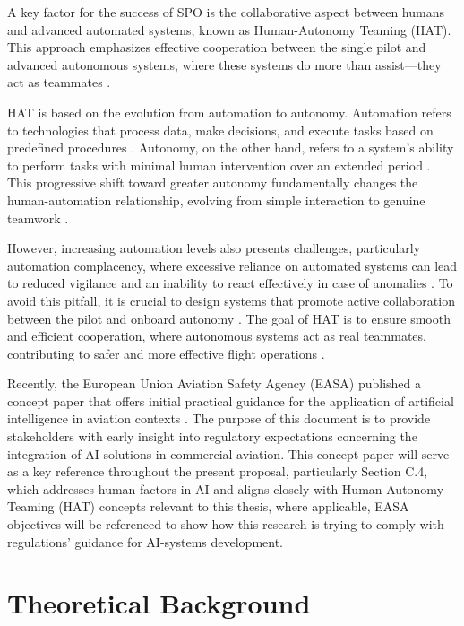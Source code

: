 \documentclass[12pt,a4paper]{article} %
\begin{document}
	A key factor for the success of SPO is the collaborative aspect between humans and advanced automated systems, known as Human-Autonomy Teaming (HAT). This approach emphasizes effective cooperation between the single pilot and advanced autonomous systems, where these systems do more than assist—they act as teammates \parencite{shively_autonomy_2017}.
	
	HAT is based on the evolution from automation to autonomy. Automation refers to technologies that process data, make decisions, and execute tasks based on predefined procedures \parencite{hoff_trust_2015, hancock_imposing_2017}. Autonomy, on the other hand, refers to a system's ability to perform tasks with minimal human intervention over an extended period \parencite{endsley_here_2017, holbrook_enabling_2020}. This progressive shift toward greater autonomy fundamentally changes the human-automation relationship, evolving from simple interaction to genuine teamwork \parencite{endsley_here_2017}.
	
	However, increasing automation levels also presents challenges, particularly automation complacency, where excessive reliance on automated systems can lead to reduced vigilance and an inability to react effectively in case of anomalies \parencite{lee_design_2023}. To avoid this pitfall, it is crucial to design systems that promote active collaboration between the pilot and onboard autonomy \parencite{endsley_here_2017}. The goal of HAT is to ensure smooth and efficient cooperation, where autonomous systems act as real teammates, contributing to safer and more effective flight operations \parencite{mcneese_chapter_2020}.

	Recently, the European Union Aviation Safety Agency (EASA) published a concept paper that offers initial practical guidance for the application of artificial intelligence in aviation contexts \parencite{easa_guidance_2024}. The purpose of this document is to provide stakeholders with early insight into regulatory expectations concerning the integration of AI solutions in commercial aviation. This concept paper will serve as a key reference throughout the present proposal, particularly Section C.4, which addresses human factors in AI and aligns closely with Human-Autonomy Teaming (HAT) concepts relevant to this thesis, where applicable, EASA objectives will be referenced to show how this research is trying to comply with regulations' guidance for AI-systems development.

	\section{Theoretical Background}
\end{document}
